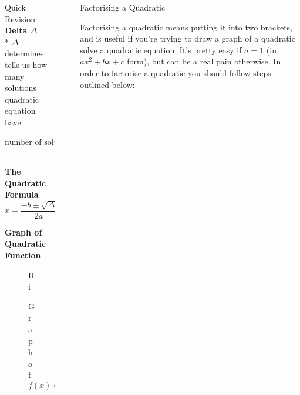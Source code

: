 \documentclass[final]{beamer}
\newlength{\sepwid}
\newlength{\onecolwid}
\newlength{\twocolwid}
\begin{document}
\begin{frame}[t]
\begin{columns}[t]
\begin{column}{\onecolwid}
\begin{block}{Quick Revision}
\textbf{Delta $\Delta$}\\*
$\Delta$ determines tells us how many solutions quadratic equation have:
$$\text{number of solutions}=
\begin{cases}
2 &\text{when } \Delta > 0\\
1 &\text{when } \Delta = 0\\
0 &\text{when } \Delta < 0
\end{cases}
$$


\textbf{The Quadratic Formula}
$$x = \frac{-b\pm \sqrt{\Delta}}{2a}$$

\textbf{Graph of Quadratic Function}

\end{block}


\begin{figure}
Hi%
\caption{Graph of $f(x)=ax^2|_{\{0.1, 0.3, 1.0, 3.0\}}$}
\end{figure}


\end{column} %

\begin{column}{\sepwid}\end{column} %

\begin{column}{\twocolwid} %

\begin{columns}[t,totalwidth=\twocolwid] %

\begin{column}{\onecolwid}\vspace{-.6in} %


\begin{block}{Factorising a Quadratic}

Factorising a quadratic means putting it into two brackets, and is useful if you're trying to draw a graph of a quadratic solve a quadratic equation. It's pretty easy if $a=1$ (in $ax^2+bx+c$ form), but can be a real pain otherwise.
\newline
\newline
In order to factorise a quadratic you should follow steps outlined below:


\end{block}
\end{column}
\end{columns}
\end{column}
\end{columns}
\end{frame}
\end{document}
